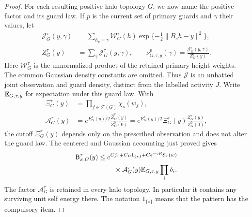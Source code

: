 \begin{proof}
For each resulting positive halo topology \(G\), we now name the
positive factor and its guard law.  If \(p\) is the current set of
primary guards and \(\gamma\) their values, let
\begin{equation}\label{ent:joint-density}
\begin{split}
 \mathcal J_G^\tau(y,\gamma)
  &=\sum_{h_p=\gamma}\mathcal W_G^\tau(h)
               \exp\{-\tfrac12\|B_sh-y\|^2\},\\
 Z_G^\tau(y)&=\sum_\gamma\mathcal J_G^\tau(y,\gamma),\qquad
 \nu_{G,\tau,y}^p(\gamma)
       =\frac{\mathcal J_G^\tau(y,\gamma)}{Z_G^\tau(y)}.
\end{split}
\end{equation}
Here \(\mathcal W_G^\tau\) is the unnormalized product of the
retained primary height weights.  The common Gaussian density
constants are omitted.  Thus \(\mathcal J\) is an unhatted joint
observation and guard density, distinct from the labelled activity
\(J\).  Write \(\mathbb E_{G,\tau,y}\) for expectation under this guard law.
With
\begin{equation}\label{ent:positive-factor}
\begin{split}
 \Xi_G^\tau(y)&=\prod_{f\in\mathcal F(G)}\chi_s(w_f),\\
 \mathcal A_G^\tau(y)
 &=e^{E_G^\tau(y)/2}\frac{\widehat Z_G^\tau(y)}{Z_G^0(0)}
 =e^{E_G^\tau(y)/2}\Xi_G^\tau(y)\frac{Z_G^\tau(y)}{Z_G^0(0)},
\end{split}
\end{equation}
the cutoff \(\Xi_G^\tau(y)\) depends only on the prescribed
observation and does not alter the guard law.  The centered and
Gaussian accounting just proved gives
\begin{equation}\label{ent:positive-topology}
\begin{split}
 \mathsf B_{\pi,G}^\tau(y)\le {}&
 e^{Cj_1+C_R1_{\{\star\}}+Ce^{-cR}\mathcal E_\pi(w)}\\
 &\quad{}\times\mathcal A_G^\tau(y)
          \mathbb E_{G,\tau,y}\prod_i\delta_i .
\end{split}
\end{equation}
The factor \(\mathcal A_G^\tau\) is retained in every halo topology.
In particular it contains any surviving unit self energy there.
The notation \(1_{\{\star\}}\) means that the pattern has the
compulsory item.


\end{proof}
